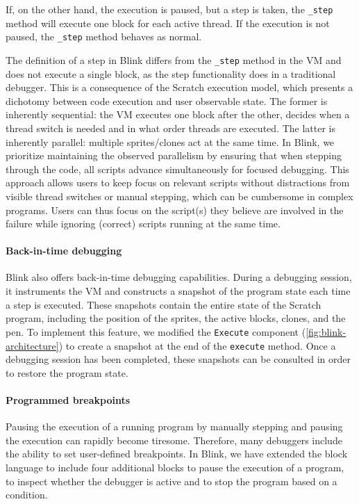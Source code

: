 \documentclass[../main]{subfiles}
\begin{document}
If, on the other hand, the execution is paused, but a step is taken, the \texttt{\_step} method will execute one block for each active thread.
If the execution is not paused, the \texttt{\_step} method behaves as normal.

The definition of a step in Blink differs from the \texttt{\_step} method in the VM and does not execute a single block, as the step functionality does in a traditional debugger.
This is a consequence of the Scratch execution model, which presents a dichotomy between code execution and user observable state.
The former is inherently sequential: the VM executes one block after the other, decides when a thread switch is needed and in what order threads are executed.
The latter is inherently parallel: multiple sprites/clones act at the same time.
In Blink, we prioritize maintaining the observed parallelism by ensuring that when stepping through the code, all scripts advance simultaneously for focused debugging.
This approach allows users to keep focus on relevant scripts without distractions from visible thread switches or manual stepping, which can be cumbersome in complex programs.
Users can thus focus on the script(s) they believe are involved in the failure while ignoring (correct) scripts running at the same time.

\paragraph{Back-in-time debugging}
Blink also offers back-in-time debugging capabilities.
During a debugging session, it instruments the VM and constructs a snapshot of the program state each time a step is executed.
These snapshots contain the entire state of the Scratch program, including the position of the sprites, the active blocks, clones, and the pen.
To implement this feature, we modified the \texttt{Execute} component (\vref{fig:blink-architecture}) to create a snapshot at the end of the \texttt{execute} method.
Once a debugging session has been completed, these snapshots can be consulted in order to restore the program state.

\paragraph{Programmed breakpoints}
Pausing the execution of a running program by manually stepping and pausing the execution can rapidly become tiresome.
Therefore, many debuggers include the ability to set user-defined breakpoints.
In Blink, we have extended the block language to include four additional blocks to pause the execution of a program, to inspect whether the debugger is active and to stop the program based on a condition.
\end{document}
